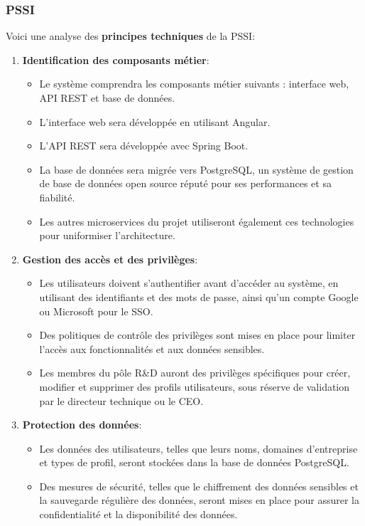 \documentclass[a4paper, 11pt]{report}
\begin{document}
  \subsubsection{PSSI}
  Voici une analyse des \textbf{principes techniques} de la PSSI:
  \begin{enumerate}
    \item \textbf{Identification des composants métier}:
      \begin{itemize}
        \item Le système comprendra les composants métier suivants : interface web, API REST et base de données.
        \item L'interface web sera développée en utilisant Angular.
        \item L'API REST sera développée avec Spring Boot.
        \item La base de données sera migrée vers PostgreSQL, un système de gestion de base de données open source réputé pour ses performances et sa fiabilité.
        \item Les autres microservices du projet utiliseront également ces technologies pour uniformiser l'architecture.
      \end{itemize}
    \item \textbf{Gestion des accès et des privilèges}:
      \begin{itemize}
        \item Les utilisateurs doivent s'authentifier avant d'accéder au système, en utilisant des identifiants et des mots de passe, ainsi qu'un compte Google ou Microsoft pour le SSO.
        \item Des politiques de contrôle des privilèges sont mises en place pour limiter l'accès aux fonctionnalités et aux données sensibles.
        \item Les membres du pôle R&D auront des privilèges spécifiques pour créer, modifier et supprimer des profils utilisateurs, sous réserve de validation par le directeur technique ou le CEO.
      \end{itemize}
    \item \textbf{Protection des données}:
      \begin{itemize}
        \item Les données des utilisateurs, telles que leurs noms, domaines d'entreprise et types de profil, seront stockées dans la base de données PostgreSQL.
        \item Des mesures de sécurité, telles que le chiffrement des données sensibles et la sauvegarde régulière des données, seront mises en place pour assurer la confidentialité et la disponibilité des données.

\end{itemize}
\end{enumerate}
\end{document}

